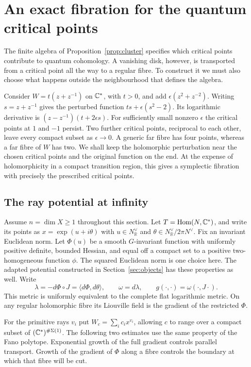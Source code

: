 \section{An exact fibration for the quantum critical points}\label{sec:compactmirror}

The finite algebra of Proposition~\ref{prop:cluster} specifies which critical points contribute to quantum cohomology. A vanishing disk, however, is transported from a critical point all the way to a regular fibre. To construct it we must also choose what happens outside the neighbourhood that defines the algebra.

Consider $W=t(z+z^{-1})$ on $\mathbb C^*$, with $t>0$, and add $\epsilon(z^2+z^{-2})$. Writing $s=z+z^{-1}$ gives the perturbed function $ts+\epsilon(s^2-2)$. Its logarithmic derivative is $(z-z^{-1})(t+2\epsilon s)$. For sufficiently small nonzero $\epsilon$ the critical points at $1$ and $-1$ persist. Two further critical points, reciprocal to each other, leave every compact subset as $\epsilon\to0$. A generic far fibre has four points, whereas a far fibre of $W$ has two. We shall keep the holomorphic perturbation near the chosen critical points and the original function on the end. At the expense of holomorphicity in a compact transition region, this gives a symplectic fibration with precisely the prescribed critical points.

\subsection{The ray potential at infinity}
Assume $n=\dim X\ge1$ throughout this section. Let $T=\operatorname{Hom}(N,\mathbb C^*)$, and write its points as $x=\exp(u+i\theta)$ with $u\in N^\vee_{\mathbb R}$ and $\theta\in N^\vee_{\mathbb R}/2\pi N^\vee$. Fix an invariant Euclidean norm. Let $\Phi(u)$ be a smooth $G$-invariant function with uniformly positive definite, bounded Hessian, and equal off a compact set to a positive two-homogeneous function $\phi$. The squared Euclidean norm is one choice here. The adapted potential constructed in Section~\ref{sec:objects} has these properties as well. Write
\[
     \lambda=-d\Phi\circ J=\langle d\Phi,d\theta\rangle,\qquad
     \omega=d\lambda,\qquad g(\cdot,\cdot)=\omega(\cdot,J\cdot).
\]
This metric is uniformly equivalent to the complete flat logarithmic metric. On any regular holomorphic fibre its Liouville field is the gradient of the restricted $\Phi$.

For the primitive rays $v_i$ put $W_c=\sum_i c_i x^{v_i}$, allowing $c$ to range over a compact subset of $(\mathbb C^*)^{\#\Sigma(1)}$. The following two estimates use the same property of the Fano polytope. Exponential growth of the full gradient controls parallel transport. Growth of the gradient of $\Phi$ along a fibre controls the boundary at which that fibre will be cut.


